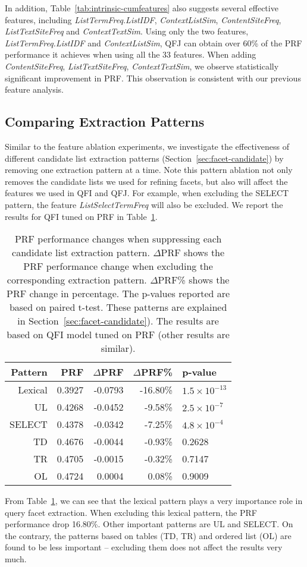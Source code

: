 In addition, Table~\ref{tab:intrinsic-cumfeatures} also suggests several effective features, including \textit{ListTermFreq.ListIDF}, \textit{ContextListSim}, \textit{ContentSiteFreq}, \textit{ListTextSiteFreq} and \textit{ContextTextSim}. Using only the two features, \textit{ListTermFreq.ListIDF} and \textit{ContextListSim}, QFJ can obtain over 60\% of the PRF performance it achieves when using all the 33 features. When adding \textit{ContentSiteFreq}, \textit{ListTextSiteFreq}, \textit{ContextTextSim}, we observe statistically significant improvement in PRF. This observation is consistent with our previous feature analysis.


\subsection{Comparing Extraction Patterns} \label{sec:intrinsic-patterns}
Similar to the feature ablation experiments, we investigate the effectiveness of different candidate list extraction patterns (Section~\ref{sec:facet-candidate}) by removing one extraction pattern at a time. Note this pattern ablation not only removes the candidate lists we used for refining facets, but also will affect the features we used in QFI and QFJ. For example, when excluding the SELECT pattern, the feature \textit{ListSelectTermFreq} will also be excluded. We report the results for QFI tuned on PRF in Table~\ref{tab:intrinsic-clists}.
\begin{table}[ht!]
\centering
\caption{PRF performance changes when suppressing each candidate list extraction pattern. $\Delta$PRF shows the PRF performance change when excluding the corresponding extraction pattern. $\Delta$PRF\% shows the PRF change in percentage. The p-values reported are based on paired t-test. These patterns are explained in Section~\ref{sec:facet-candidate}). The results are based on QFI model tuned on PRF (other results are similar).}
\label{tab:intrinsic-clists}
\begin{tabular}{|r|r|r|r|l|} \hline
Pattern & PRF & $\Delta$PRF & $\Delta$PRF\% & p-value\\ \hline
Lexical & 0.3927 & -0.0793 & -16.80\% & $1.5\times10^{-13}$ \\ \hline
UL & 0.4268 & -0.0452 & -9.58\% & $2.5\times10^{-7}$ \\ \hline
SELECT & 0.4378 & -0.0342 & -7.25\% & $4.8\times10^{-4}$ \\ \hline
TD & 0.4676 & -0.0044 & -0.93\% & 0.2628 \\ \hline
TR & 0.4705 & -0.0015 & -0.32\% & 0.7147 \\ \hline
OL & 0.4724 & 0.0004 & 0.08\% & 0.9009 \\ \hline
\end{tabular}
\end{table}
From Table~\ref{tab:intrinsic-clists}, we can see that the lexical pattern plays a very importance role in query facet extraction. When excluding this lexical pattern, the PRF performance drop 16.80\%. Other important patterns are UL and SELECT. On the contrary, the patterns based on tables (TD, TR) and ordered list (OL) are found to be less important -- excluding them does not affect the results very much.

